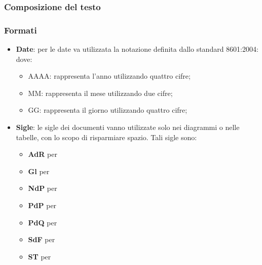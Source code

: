 		\subsubsection{Composizione del testo}
		\subsubsection{Formati}
		\begin{itemize}
			\item \textbf{Date}: per le date va utilizzata la notazione definita dallo standard  8601:2004:
			dove:
			\begin{itemize}
				\item AAAA: rappresenta l'anno utilizzando quattro cifre;
				\item MM: rappresenta il mese utilizzando due cifre;
				\item GG: rappresenta il giorno utilizzando quattro cifre;
			\end{itemize}
			\item \textbf{Sigle}: le sigle dei documenti vanno utilizzate solo nei diagrammi o nelle tabelle, con lo scopo di risparmiare spazio. Tali sigle sono:
			\begin{itemize}
				\item \textbf{AdR} per \ARdoc
				\item \textbf{Gl} per \Gldoc
				\item \textbf{NdP} per \NPdoc
				\item \textbf{PdP} per \PPdoc
				\item \textbf{PdQ} per \PQdoc
				\item \textbf{SdF} per \SFdoc
				\item \textbf{ST} per \STdoc
			\end{itemize}	
		\end{itemize}
